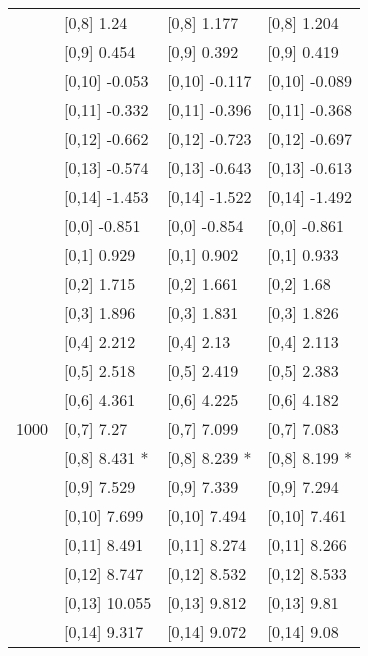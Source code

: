 \begin{table}
\begin{tabular}[t]{llll}
 & {}[0,8] 1.24 & {}[0,8] 1.177 & {}[0,8] 1.204\\
 & {}[0,9] 0.454 & {}[0,9] 0.392 & {}[0,9] 0.419\\
\addlinespace
 & {}[0,10] -0.053 & {}[0,10] -0.117 & {}[0,10] -0.089\\
 & {}[0,11] -0.332 & {}[0,11] -0.396 & {}[0,11] -0.368\\
 & {}[0,12] -0.662 & {}[0,12] -0.723 & {}[0,12] -0.697\\
 & {}[0,13] -0.574 & {}[0,13] -0.643 & {}[0,13] -0.613\\
 & {}[0,14] -1.453 & {}[0,14] -1.522 & {}[0,14] -1.492\\
\addlinespace
 & {}[0,0] -0.851 & {}[0,0] -0.854 & {}[0,0] -0.861\\
 & {}[0,1] 0.929 & {}[0,1] 0.902 & {}[0,1] 0.933\\
 & {}[0,2] 1.715 & {}[0,2] 1.661 & {}[0,2] 1.68\\
 & {}[0,3] 1.896 & {}[0,3] 1.831 & {}[0,3] 1.826\\
 & {}[0,4] 2.212 & {}[0,4] 2.13 & {}[0,4] 2.113\\
\addlinespace
 & {}[0,5] 2.518 & {}[0,5] 2.419 & {}[0,5] 2.383\\
 & {}[0,6] 4.361 & {}[0,6] 4.225 & {}[0,6] 4.182\\
1000 & {}[0,7] 7.27 & {}[0,7] 7.099 & {}[0,7] 7.083\\
 & {}[0,8] 8.431 * & {}[0,8] 8.239 * & {}[0,8] 8.199 *\\
 & {}[0,9] 7.529 & {}[0,9] 7.339 & {}[0,9] 7.294\\
\addlinespace
 & {}[0,10] 7.699 & {}[0,10] 7.494 & {}[0,10] 7.461\\
 & {}[0,11] 8.491 & {}[0,11] 8.274 & {}[0,11] 8.266\\
 & {}[0,12] 8.747 & {}[0,12] 8.532 & {}[0,12] 8.533\\
 & {}[0,13] 10.055 & {}[0,13] 9.812 & {}[0,13] 9.81\\
 & {}[0,14] 9.317 & {}[0,14] 9.072 & {}[0,14] 9.08\\
\bottomrule
\end{tabular}
\end{table}
